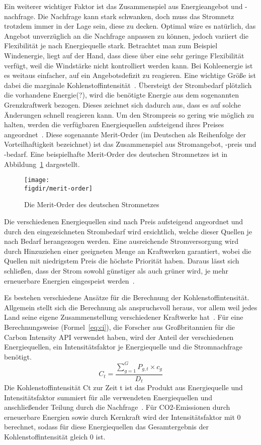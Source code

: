 Ein weiterer wichtiger Faktor ist das Zusammenspiel aus Energieangebot und -nachfrage.
Die Nachfrage kann stark schwanken, doch muss das Stromnetz trotzdem immer in der Lage sein, diese zu decken.
Optimal wäre es natürlich, das Angebot unverzüglich an die Nachfrage anpassen zu können, jedoch variiert die Flexibilität je nach Energiequelle stark.
Betrachtet man zum Beispiel Windenergie, liegt auf der Hand, dass diese über eine sehr geringe Flexibilität verfügt, weil die Windstärke nicht kontrolliert werden kann.
Bei Kohleenergie ist es weitaus einfacher, auf ein Angebotsdefizit zu reagieren.
Eine wichtige Größe ist dabei die marginale Kohlenstoffintensität~\cite{GreenSoftwareFoundation.2022}.
Übersteigt der Strombedarf plötzlich die vorhandene Energie(?), wird die benötigte Energie aus dem sogenannten Grenzkraftwerk bezogen.
Dieses zeichnet sich dadurch aus, dass es auf solche Änderungen schnell reagieren kann.
Um den Strompreis so gering wie möglich zu halten, werden die verfügbaren Energiequellen aufsteigend ihres Preises angeordnet~\cite{Corradi.20231207T10:48:51.000Z}.
Diese sogenannte Merit-Order (im Deutschen als Reihenfolge der Vorteilhaftigkeit bezeichnet) ist das Zusammenspiel aus Stromangebot, -preis und -bedarf.
Eine beispielhafte Merit-Order des deutschen Stromnetzes ist in Abbildung~\ref{FIG:merit-order} dargestellt.
\begin{figure}
 \caption{Die Merit-Order des deutschen Stromnetzes~\cite{Gro.5.10.2022}}
 {\texttt{[image: \\figdir/merit-order]}}
 \label{FIG:merit-order}
\end{figure}
Die verschiedenen Energiequellen sind nach Preis aufsteigend angeordnet und durch den eingezeichneten Strombedarf wird ersichtlich, welche dieser Quellen je nach Bedarf herangezogen werden.
Eine ausreichende Stromversorgung wird durch Hinzuziehen einer geeigneten Menge an Kraftwerken garantiert, wobei die Quellen mit niedrigstem Preis die höchste Priorität haben.
Daraus lässt sich schließen, dass der Strom sowohl günstiger als auch grüner wird, je mehr erneuerbare Energien eingespeist werden~\cite{Gro.5.10.2022}.

Es bestehen verschiedene Ansätze für die Berechnung der Kohlenstoffintensität.
Allgemein stellt sich die Berechnung als anspruchsvoll heraus, vor allem weil jedes Land seine eigene Zusammenstellung verschiedener Kraftwerke hat~\cite{Currie.2024}.
Für eine Berechnungsweise (Formel~\ref{eq:ci}), die Forscher aus Großbritannien für die Carbon Intensity \ac{API} verwendet haben, wird der Anteil der verschiedenen Energiequellen, ein Intensitätsfaktor je Energiequelle und die Stromnachfrage benötigt.
\begin{equation}
 \label{eq:ci}
 C_t = \frac{\sum_{g=1}^{G} P_{g,t} \times c_g}{D_t}
\end{equation}
Die Kohlenstoffintensität Ct zur Zeit t ist das Produkt aus Energiequelle und Intensitätsfaktor summiert für alle verwendeten Energiequellen und anschließender Teilung durch die Nachfrage~\cite{LyndonRuff.20220420T15:34:17.000Z}.
Für \ac{CO2}-Emissionen durch erneuerbare Energien sowie durch Kernkraft wird der Intensitätsfaktor mit 0 berechnet, sodass für diese Energiequellen das Gesamtergebnis der Kohlenstoffintensität gleich 0 ist.

